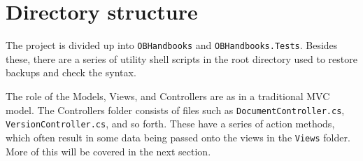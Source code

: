 \section{Directory structure}
The project is divided up into \texttt{OBHandbooks} and \texttt{OBHandbooks.Tests}.
Besides these, there are a series of utility shell scripts in the root directory used to restore backups and check the syntax.

The role of the Models, Views, and Controllers are as in a traditional MVC model.
The Controllers folder consists of files such as \texttt{DocumentController.cs}, \texttt{VersionController.cs}, and so forth.
These have a series of action methods, which often result in some data being passed onto the views in the \texttt{Views} folder.
More of this will be covered in the next section.
